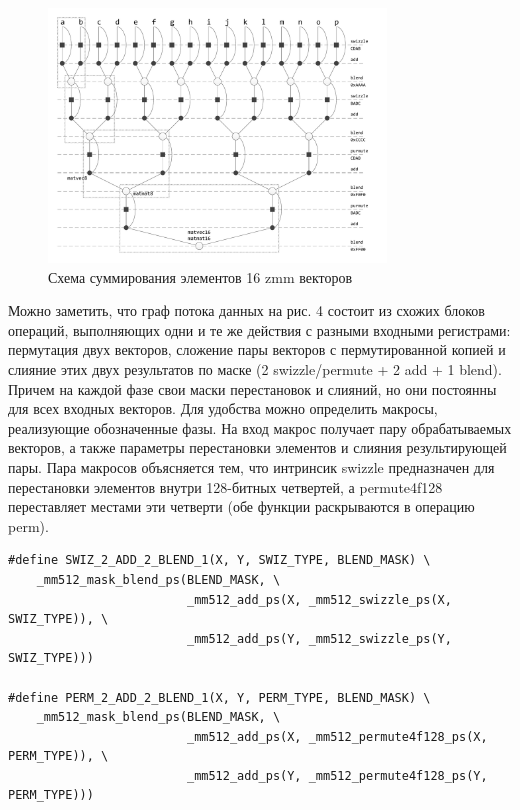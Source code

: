 \begin{figure}[ht]
	\centering
		\includegraphics[width=0.8\textwidth]{./pics/text_4_small_matr/operations_tree.pdf}
	\caption{Схема суммирования элементов 16 zmm векторов}
	\label{fig:text_4_small_matr_operations_tree}
\end{figure}

Можно заметить, что граф потока данных на рис. 4 состоит из схожих блоков операций, выполняющих одни и те же действия с разными входными регистрами: пермутация двух векторов, сложение пары векторов с пермутированной копией и слияние этих двух результатов по маске (2 swizzle/permute + 2 add + 1 blend).
Причем на каждой фазе свои маски перестановок и слияний, но они постоянны для всех входных векторов.
Для удобства можно определить макросы, реализующие обозначенные фазы. На вход макрос получает пару обрабатываемых векторов, а также параметры перестановки элементов и слияния результирующей пары.
Пара макросов объясняется тем, что интринсик swizzle предназначен для перестановки элементов внутри 128-битных четвертей, а permute4f128 переставляет местами эти четверти (обе функции раскрываются в операцию perm).

\begin{lstlisting}[caption={Макрос SWIZ}, label={lst:text_4_small_matr_swiz_macro}]
#define SWIZ_2_ADD_2_BLEND_1(X, Y, SWIZ_TYPE, BLEND_MASK) \
    _mm512_mask_blend_ps(BLEND_MASK, \
                         _mm512_add_ps(X, _mm512_swizzle_ps(X, SWIZ_TYPE)), \
                         _mm512_add_ps(Y, _mm512_swizzle_ps(Y, SWIZ_TYPE)))

#define PERM_2_ADD_2_BLEND_1(X, Y, PERM_TYPE, BLEND_MASK) \
    _mm512_mask_blend_ps(BLEND_MASK, \
                         _mm512_add_ps(X, _mm512_permute4f128_ps(X, PERM_TYPE)), \
                         _mm512_add_ps(Y, _mm512_permute4f128_ps(Y, PERM_TYPE)))
\end{lstlisting}

